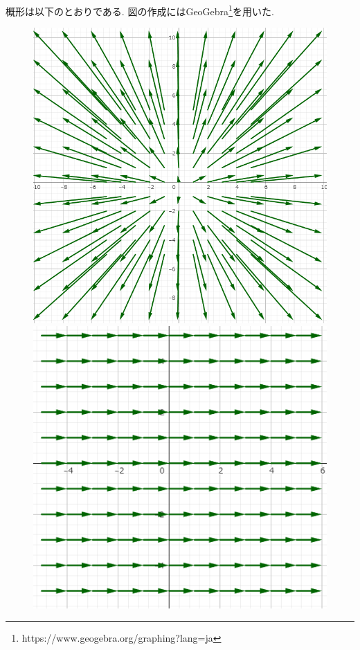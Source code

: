 \documentclass[a4j,dvipdfmx]{jsarticle}
\begin{document}
        \begin{qparts}
            \qpart 概形は以下のとおりである. 図の作成にはGeoGebra\footnote{https://www.geogebra.org/graphing?lang=ja}を用いた.
            \begin{figure}[h]
                \begin{minipage}[t]{.3\textwidth}
                    \centering
                    \includegraphics[scale=0.25]{img/vector_field1.png}
                \end{minipage}
                \begin{minipage}[t]{.3\textwidth}
                    \centering
                    \includegraphics[scale=0.35]{img/vector_field2.png}

\end{minipage}
\end{figure}
\end{qparts}
\end{document}
